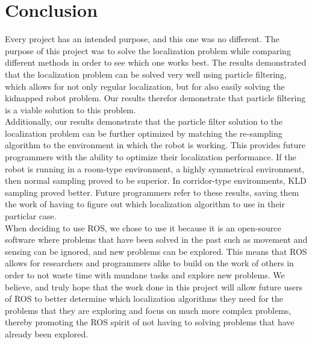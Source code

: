 \documentclass{article}
\newcommand\tab[1][0.5cm]{\hspace*{#1}}
\begin{document}
\section{Conclusion}
\tab Every project has an intended purpose, and this one was no different. The purpose of this project was to solve the localization problem while comparing different methods in order to see which one works best. The results demonstrated that the localization problem can be solved very well using particle filtering, which allows for not only regular localization, but for also easily solving the kidnapped robot problem. Our results therefor demonstrate that particle filtering is a viable solution to this problem.\\

Additionally, our results demonstrate that the particle filter solution to the localization problem can be further optimized by matching the re-sampling algorithm to the environment in which the robot is working. This provides future programmers with the ability to optimize their localization performance. If the robot is running in a room-type environment, a highly symmetrical environment, then normal sampling proved to be superior. In corridor-type environments, KLD sampling proved better. Future programmers refer to these results, saving them the work of having to figure out which localization algorithm to use in their particlar case.\\

When deciding to use ROS, we chose to use it because it is an open-source software where problems that have been solved in the past such as movement and sensing can be ignored, and new problems can be explored. This means that ROS allows for researchers and programmers alike to build on the work of others in order to not waste time with mundane tasks and explore new problems. We believe, and truly hope that the work done in this project will allow future users of ROS to better determine which localization algorithms they need for the problems that they are exploring and focus on much more complex problems, thereby promoting the ROS spirit of not having to solving problems that have already been explored.
\end{document}
